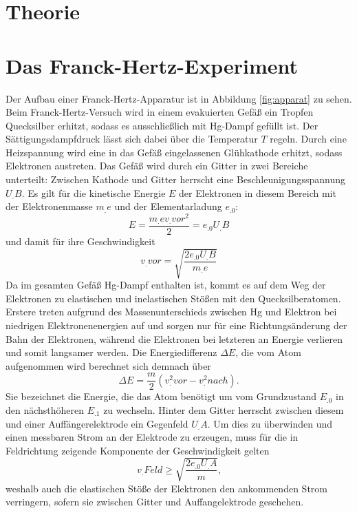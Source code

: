 
\section{Theorie}
\label{sec:Theorie}

\section{Das Franck-Hertz-Experiment}
Der Aufbau einer Franck-Hertz-Apparatur ist in Abbildung \ref{fig:apparat} zu sehen.
Beim Franck-Hertz-Versuch wird in einem evakuierten Gefäß ein Tropfen Quecksilber erhitzt, sodass es ausschließlich mit Hg-Dampf gefüllt ist. Der Sättigungsdampfdruck lässt sich dabei über die Temperatur $T$ regeln.
Durch eine Heizspannung wird eine in das Gefäß eingelassenen Glühkathode erhitzt, sodass Elektronen austreten. 
Das Gefäß wird durch ein Gitter in zwei Bereiche unterteilt:
Zwischen Kathode und Gitter herrscht eine Beschleunigungsspannung $U_.B$.
Es gilt für die kinetische Energie $E$ der Elektronen in diesem Bereich mit der Elektronenmasse $m_.e$ und der Elementarladung $e_.0$:
\begin{equation*}
E=\frac{m_.ev_.{vor^2}}{2}=e_.0U_.B
\end{equation*}
und damit für ihre Geschwindigkeit
\begin{equation}
v_.{vor}=\sqrt{\frac{2e_.0U_.B}{m_.e}\label{eq:v}}
\end{equation}
Da im gesamten Gefäß Hg-Dampf enthalten ist, kommt es auf dem Weg der Elektronen zu elastischen und inelastischen Stößen mit den Quecksilberatomen. Erstere treten aufgrund des Massenunterschieds zwischen Hg und Elektron bei niedrigen Elektronenenergien auf und sorgen nur für eine Richtungsänderung der Bahn der Elektronen, während die Elektronen bei letzteren an Energie verlieren und somit langsamer werden.
Die Energiedifferenz $\Delta E$, die vom Atom aufgenommen wird berechnet sich demnach über
\[
\Delta E = \frac{m}{2}\left(v^2_.{vor}-v^2_.{nach}\right)\text{.}\label{eq:DeltaE}
\]
Sie bezeichnet die Energie, die das Atom benötigt um vom Grundzustand $E_.0$ in den nächsthöheren $E_.1$ zu wechseln.
Hinter dem Gitter herrscht zwischen diesem und einer Auffängerelektrode ein Gegenfeld $U_.A$.
Um dies zu überwinden und einen messbaren Strom an der Elektrode zu erzeugen, muss für die in Feldrichtung zeigende Komponente der Geschwindigkeit gelten
\[
v_.{Feld}\geq \sqrt{\frac{2e_.0U_.A}{m}}\text{,}
\]
weshalb auch die elastischen Stöße der Elektronen den ankommenden Strom verringern, sofern sie zwischen Gitter und Auffangelektrode geschehen.
